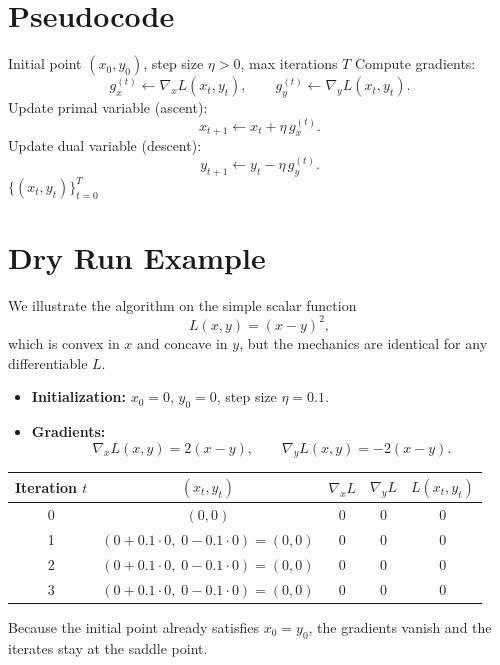 \documentclass[11pt]{article}
\begin{document}
\section{Pseudocode}
\begin{algorithm}[H]
\caption{Simultaneous Gradient Descent–Ascent (GDA)}\label{alg:GDA}
\begin{algorithmic}[1]
\Require Initial point $(x_0,y_0)$, step size $\eta>0$, max iterations $T$
    \State Compute gradients:
    \[
    g_{x}^{(t)} \gets \nabla_{x}L(x_t,y_t),\qquad 
    g_{y}^{(t)} \gets \nabla_{y}L(x_t,y_t).
    \]
    \State Update primal variable (ascent):
    \[
    x_{t+1} \gets x_t + \eta\, g_{x}^{(t)}.
    \]
    \State Update dual variable (descent):
    \[
    y_{t+1} \gets y_t - \eta\, g_{y}^{(t)}.
    \]
\EndFor
\State \Return $\{(x_t,y_t)\}_{t=0}^{T}$
\end{algorithmic}
\end{algorithm}

\section{Dry Run Example}
We illustrate the algorithm on the simple scalar function
\[
L(x,y)= (x-y)^2,
\]
which is convex in $x$ and concave in $y$, but the mechanics are identical for any differentiable $L$.

\begin{itemize}
\item \textbf{Initialization:} $x_0=0$, $y_0=0$, step size $\eta=0.1$.
\item \textbf{Gradients:}
\[
\nabla_x L(x,y)=2(x-y),\qquad 
\nabla_y L(x,y)=-2(x-y).
\]
\end{itemize}

\begin{center}
\begin{tabular}{c|c|c|c|c}
Iteration $t$ & $(x_t,y_t)$ & $\nabla_x L$ & $\nabla_y L$ & $L(x_t,y_t)$\\ \hline
0 & $(0,0)$ & $0$ & $0$ & $0$\\
1 & $(0+0.1\cdot0,\;0-0.1\cdot0)=(0,0)$ & $0$ & $0$ & $0$\\
2 & $(0+0.1\cdot0,\;0-0.1\cdot0)=(0,0)$ & $0$ & $0$ & $0$\\
3 & $(0+0.1\cdot0,\;0-0.1\cdot0)=(0,0)$ & $0$ & $0$ & $0$
\end{tabular}
\end{center}
Because the initial point already satisfies $x_0=y_0$, the gradients vanish and the iterates stay at the saddle point.  
\end{document}
